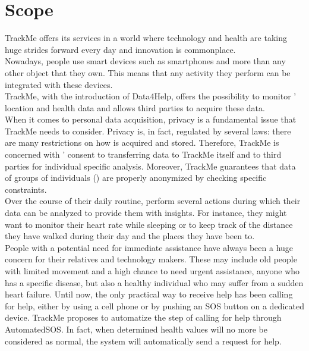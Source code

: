 \documentclass[../../rasd.tex]{subfiles}
\begin{document}
\section{Scope}
TrackMe offers its services in a world where technology and health are taking huge strides forward every day and innovation is commonplace.\\
Nowadays, people use smart devices such as smartphones and  more than any other object that they own. This means that any activity they perform can be integrated with these devices.\\
TrackMe, with the introduction of Data4Help, offers the possibility to monitor ’ location and health data and allows third parties to acquire these data.\\

When it comes to personal data acquisition, privacy is a fundamental issue that TrackMe needs to consider. Privacy is, in fact, regulated by several laws: there are many restrictions on how  is acquired and stored. Therefore, TrackMe is concerned with ’ consent to transferring data to TrackMe itself and to third parties for individual specific analysis. Moreover, TrackMe guarantees that data of groups of individuals () are properly anonymized by checking specific constraints.\\

Over the course of their daily routine,  perform several actions during which their data can be analyzed to provide them with insights. For instance, they might want to monitor their heart rate while sleeping or to keep track of the distance they have walked during their day and the places they have been to.\\

People with a potential need for immediate assistance have always been a huge concern for their relatives and technology makers. These may include old people with limited movement and a high chance to need urgent assistance, anyone who has a specific disease, but also a healthy individual who may suffer from a sudden heart failure. Until now, the only practical way to receive help has been calling for help, either by using a cell phone or by pushing an SOS button on a dedicated device. TrackMe proposes to automatize the step of calling for help through AutomatedSOS. In fact, when determined health values will no more be considered as normal, the system will automatically send a request for help.\\
\end{document}
